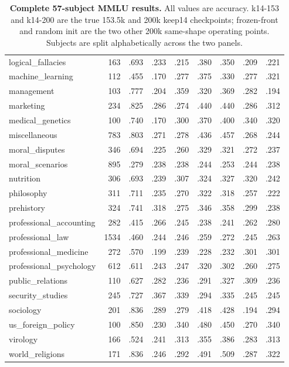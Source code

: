 \begin{table}[t]
\begin{minipage}[t]{.495\textwidth}
{\begin{tabular}{@{}lrrrrrrrr@{}}
logical\_fallacies & 163 & .693 & .233 & .215 & .380 & .350 & .209 & .221 \\
machine\_learning & 112 & .455 & .170 & .277 & .375 & .330 & .277 & .321 \\
management & 103 & .777 & .204 & .359 & .320 & .369 & .282 & .194 \\
marketing & 234 & .825 & .286 & .274 & .440 & .440 & .286 & .312 \\
medical\_genetics & 100 & .740 & .170 & .300 & .370 & .400 & .340 & .320 \\
miscellaneous & 783 & .803 & .271 & .278 & .436 & .457 & .268 & .244 \\
moral\_disputes & 346 & .694 & .225 & .260 & .329 & .321 & .272 & .237 \\
moral\_scenarios & 895 & .279 & .238 & .238 & .244 & .253 & .244 & .238 \\
nutrition & 306 & .693 & .239 & .307 & .324 & .327 & .320 & .242 \\
philosophy & 311 & .711 & .235 & .270 & .322 & .318 & .257 & .222 \\
prehistory & 324 & .741 & .318 & .275 & .346 & .358 & .299 & .238 \\
professional\_accounting & 282 & .415 & .266 & .245 & .238 & .241 & .262 & .280 \\
professional\_law & 1534 & .460 & .244 & .246 & .259 & .272 & .245 & .263 \\
professional\_medicine & 272 & .570 & .199 & .239 & .228 & .232 & .301 & .301 \\
professional\_psychology & 612 & .611 & .243 & .247 & .320 & .302 & .260 & .275 \\
public\_relations & 110 & .627 & .282 & .236 & .291 & .327 & .309 & .236 \\
security\_studies & 245 & .727 & .367 & .339 & .294 & .335 & .245 & .245 \\
sociology & 201 & .836 & .289 & .279 & .418 & .428 & .194 & .294 \\
us\_foreign\_policy & 100 & .850 & .230 & .340 & .480 & .450 & .270 & .340 \\
virology & 166 & .524 & .241 & .313 & .355 & .386 & .283 & .313 \\
world\_religions & 171 & .836 & .246 & .292 & .491 & .509 & .287 & .322 \\
\bottomrule
\end{tabular}%
}
\end{minipage}
\caption{\textbf{Complete 57-subject MMLU results.} All values are accuracy. k14-153 and k14-200 are the true 153.5k and 200k keep14 checkpoints; frozen-front and random init are the two other 200k same-shape operating points. Subjects are split alphabetically across the two panels.}
\label{tab:app-mmlu-full}
\end{table}
